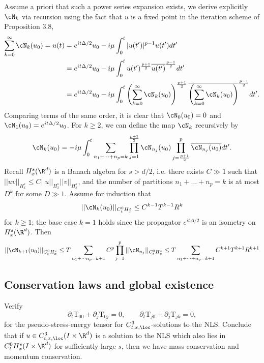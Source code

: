 \begin{solution}
	Assume a priori that such a power series expansion exists, we derive explicitly $\cN_k$ via recursion using the fact that $u$ is a fixed point in the iteration scheme of Proposition 3.8,
		\begin{align*}
			 \sum_{k = 0}^\infty \cN_k (u_0) = u(t) 
			 	&= e^{it \Delta/2} u_0 - i \mu \int_0^t |u(t')|^{p - 1} u(t') dt' \\
			 	&= e^{i t\Delta/2} u_0 - i \mu \int_0^t u(t')^{\frac{p + 1}{2}}\overline{ u(t')}^{\frac{p - 1}{2}} dt'\\
			 	&= e^{i t \Delta/2} u_0  - i \mu \int_0^t \left( \sum_{k = 0}^\infty \cN_k (u_0)\right)^{\frac{p + 1}{2}} \overline{\left( \sum_{k = 0}^\infty \cN_k (u_0)\right)}^{\frac{p - 1}{2}} dt'.
		\end{align*}
	Comparing terms of the same order, it is clear that $\cN_0 (u_0) = 0$ and $\cN_1 (u_0) = e^{it \Delta/2} u_0$. For $k \geq 2$, we can define the map $\cN_k$ recursively by 
		\[ \cN_k (u_0) = - i \mu \int_0^t \sum_{n_1 + \dots + n_p = k} \prod_{j = 1}^{\frac{p + 1}{2}} \cN_{n_j} (u_0)  \prod_{j = \frac{p + 1}{2}}^p \overline{\cN_{n_j} (u_0)} dt'.\]	
	Recall $H^s_x (\R^d)$ is a Banach algebra for $s > d/2$, i.e. there exists $C \gg 1$ such that $||uv||_{H^s_x} \leq C ||u||_{H^s_x} ||v||_{H^s_x}$, and the number of partitions $n_1 + \dots + n_p = k$ is at most $D^k$ for some $D \gg 1 $. Assume for induction that 
		\[ ||\cN_k (u_0)||_{C^0_t H^s_x} \leq C^{k - 1} T^{k - 1} R^k  \]
	for $k \geq 1$; the base case $k = 1$ holds since the propagator $e^{i t \Delta/2}$ is an isometry on $H^s_x (\R^d)$. Then 
		\[ ||\cN_{k + 1} (u_0)||_{C^0_t H^s_x} \leq T \sum_{n_1 + \cdots n_p = k + 1} C^p \prod_{j = 1}^p ||\cN_{n_j} ||_{C_t^0 H^s_x} \leq T  \sum_{n_1 + \cdots + n_p = k + 1} C^{k + 1} T^{k + 1} R^{k + 1}  \]	
\end{solution}

\subsection{Conservation laws and global existence}

\begin{statement}
	Verify
		\[ \partial_t \text{T}_{00} + \partial_j \text{T}_{0j} = 0, \qquad \partial_t \text{T}_{j0} + \partial_j \text{T}_{jk} = 0, \]
	for the pseudo-stress-energy tensor for $C^3_{t, x, \loc}$-solutions to the NLS. Conclude that if $u \in C^3_{t, x, \loc} (I \times \R^d)$ is a solution to the NLS which also lies in $C^0_t H^s_x (I \times \R^d)$ for sufficiently large $s$, then we have mass conservation and momentum conservation. 
\end{statement}

